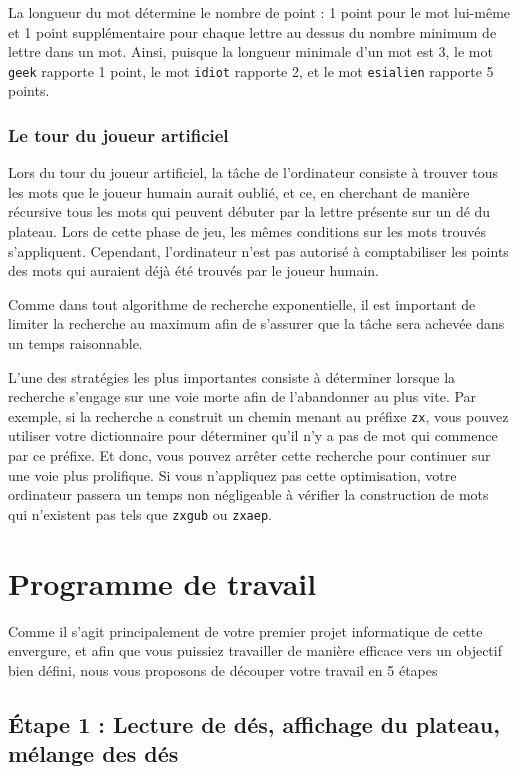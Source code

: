 \documentclass[10pt]{article}
\begin{document}
La longueur du mot détermine le nombre de point : 1 point pour le mot lui-même
et 1 point supplémentaire pour chaque lettre au dessus du nombre minimum de
lettre dans un mot. Ainsi, puisque la longueur minimale d'un mot est 3, le mot
\texttt{geek} rapporte 1 point, le mot \texttt{idiot} rapporte 2, et le mot
\texttt{esialien} rapporte 5 points.


\subsubsection*{Le tour du joueur artificiel}

Lors du tour du joueur artificiel, la tâche de l'ordinateur consiste à trouver
tous les mots que le joueur humain aurait oublié, et ce, en cherchant de
manière récursive tous les mots qui peuvent débuter par la lettre présente sur
un dé du plateau. Lors de cette phase de jeu, les mêmes conditions sur les
mots trouvés s'appliquent. Cependant, l'ordinateur n'est pas autorisé à
comptabiliser les points des mots qui auraient déjà été trouvés par le joueur
humain.

Comme dans tout algorithme de recherche exponentielle, il est important de
limiter la recherche au maximum afin de s'assurer que la tâche sera achevée
dans un temps raisonnable. 

L'une des stratégies les plus importantes consiste à déterminer lorsque la
recherche s'engage sur une voie morte afin de l'abandonner au plus vite. Par
exemple, si la recherche a construit un chemin menant au préfixe \texttt{zx},
vous pouvez utiliser votre dictionnaire pour déterminer qu'il n'y a pas de mot
qui commence par ce préfixe. Et donc, vous pouvez arrêter cette recherche pour
continuer sur une voie plus prolifique. Si vous n'appliquez pas cette
optimisation, votre ordinateur passera un temps non négligeable à vérifier la
construction de mots qui n'existent pas tels que \texttt{zxgub} ou
\texttt{zxaep}.



\section*{Programme de travail}

Comme il s'agit principalement de votre premier projet informatique de cette
envergure, et afin que vous puissiez travailler de manière efficace vers un
objectif bien défini, nous vous proposons de découper votre travail en 5
étapes

	
\subsection*{\'Etape 1 : Lecture de dés, affichage du plateau, mélange des dés}
\end{document}
